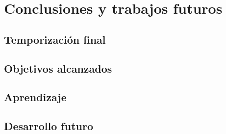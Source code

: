 \chapter{Conclusiones y trabajos futuros}

\section{Temporización final}

\section{Objetivos alcanzados}

\section{Aprendizaje}

\section{Desarrollo futuro}